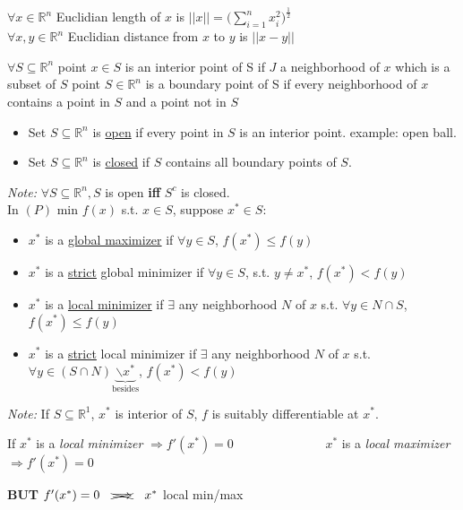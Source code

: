\begin{definition-N}
	$\forall x \in \mathbb{R}^n$ Euclidian length of $x$ is $||x|| = \bigg( \sum\limits_{i=1}^n x_i^2\bigg)^{\frac{1}{2}}$\\
	$\forall x,y \in \mathbb{R}^n$ Euclidian distance from $x$ to $y$ is $||x-y||$
\end{definition-N}
\begin{definition-N}
	$\forall S \subseteq \mathbb{R}^n$ point $x \in S$ is an interior point of S if $J$ a neighborhood of $x$ which is a subset of $S$ point $S \in \mathbb{R}^n$ is a boundary point of S if every neighborhood of $x$ contains a point in $S$ and a point not in $S$
	\begin{itemize}
	\item Set $S \subseteq \mathbb{R}^n$ is \underline{open} if every point in $S$ is an interior point. \textsf{example: open ball.}
	\item  Set $S \subseteq \mathbb{R}^n$ is \underline{closed} if $S$ contains all boundary points of $S$.
\end{itemize}
 \emph{Note:} $\forall S \subseteq \mathbb{R}^n, S$ is open \textbf{iff} $S^c$ is closed.\\
In $(P)$ min $f(x)$ s.t. $x \in S$, suppose $x^* \in S$:
 \begin{itemize}
 	\item $x^*$ is a \underline{global maximizer} if $\forall y \in S$, $f(x^*) \leq f(y)$
 	\item $x^*$ is a \underline{strict} global minimizer if $\forall y \in S$, s.t. $y \neq x^*$, $f(x^*) < f(y)$
 	\item $x^*$ is a \underline{local minimizer} if $\exists$ any neighborhood $N$ of $x$ s.t. $\forall y \in N \cap S$, $f(x^*) \leq f(y)$
 	\item $x^*$ is a \underline{strict} local minimizer if $\exists$ any neighborhood $N$ of $x$ s.t. $\forall y \in (S \cap N)\underbrace{\backslash x^*}_{\text{besides}}$, $f(x^*) < f(y)$
 \end{itemize}
\end{definition-N}
\emph{Note:} If $S \subseteq \mathbb{R}^1$, $x^*$ is interior of $S$, $f$ is suitably differentiable at $x^*$.
\begin{center}
If $x^*$ is a \textsl{local minimizer} $\Rightarrow f'(x^*) = 0 \hspace{7em}$  $x^*$ is a \textsl{local maximizer} $\Rightarrow f'(x^*) = 0$	
\end{center}
\begin{center}
	{\Large \textbf{BUT} $f'(x^*) = 0 \quad \xcancel{\Longrightarrow} \quad x^*$ local min/max}
\end{center}

